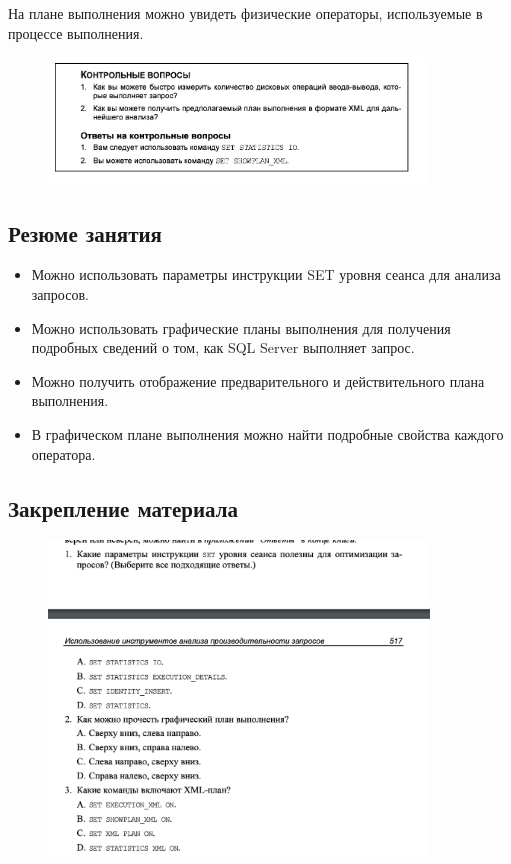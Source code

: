 На плане выполнения можно увидеть физические операторы, используемые в процессе выполнения.


\begin{figure}[h!]
	\begin{center}
		\includegraphics[width=0.9\textwidth]{img/control41.png}
	\end{center}
	\captionsetup{justification=centering}
\end{figure}

		
\subsection*{Резюме занятия}
\begin{itemize}
	\item Можно использовать параметры инструкции SET уровня сеанса для анализа
	запросов. 
	\item Можно использовать графические планы выполнения для получения подробных
	сведений о том, как SQL Server выполняет запрос. 
	\item Можно получить отображение предварительного и действительного плана выполнения. 
	\item В графическом плане выполнения можно найти подробные свойства каждого
	оператора. 
\end{itemize}


\subsection*{Закрепление материала}

\begin{figure}[h!]
	\begin{center}
		\includegraphics[width=0.9\textwidth]{img/zakrep41.png}
	\end{center}
	\captionsetup{justification=centering}
\end{figure}
\clearpage

